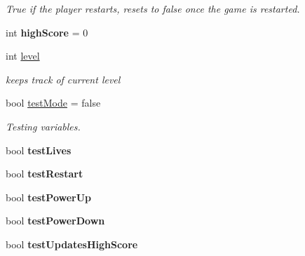 \begin{DoxyCompactItemize}
\begin{DoxyCompactList}\small\item\em True if the player restarts, resets to false once the game is restarted. \end{DoxyCompactList}\item 
\mbox{\label{class_player_controller_adba61318804b2e3f908c6e3290ca755d}} 
int {\bfseries high\+Score} = 0
\item 
\mbox{\label{class_player_controller_a72b14fadfbe633bb3ba317b2a59c557e}} 
int \mbox{\hyperlink{class_player_controller_a72b14fadfbe633bb3ba317b2a59c557e}{level}}
\begin{DoxyCompactList}\small\item\em keeps track of current level \end{DoxyCompactList}\item 
\mbox{\label{class_player_controller_a99608cc786dba21c5c1dc22f4cef1327}} 
bool \mbox{\hyperlink{class_player_controller_a99608cc786dba21c5c1dc22f4cef1327}{test\+Mode}} = false
\begin{DoxyCompactList}\small\item\em Testing variables. \end{DoxyCompactList}\item 
\mbox{\label{class_player_controller_a9dcb593b13e3fd9145f5d749a0931eb0}} 
bool {\bfseries test\+Lives}
\item 
\mbox{\label{class_player_controller_a2de6872ee0710f0969004e1b26b01e47}} 
bool {\bfseries test\+Restart}
\item 
\mbox{\label{class_player_controller_affbbdfb14b0f101485d4dc1a54883f38}} 
bool {\bfseries test\+Power\+Up}
\item 
\mbox{\label{class_player_controller_aa8cf3b4a76e12592ce5b52bf5a6dae35}} 
bool {\bfseries test\+Power\+Down}
\item 
\mbox{\label{class_player_controller_aa95666d7ebdc47342a0fe58a8c58d846}} 
bool {\bfseries test\+Updates\+High\+Score}
\item 

\end{DoxyCompactItemize}
